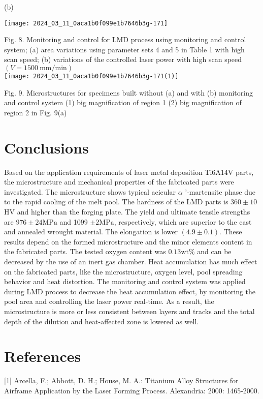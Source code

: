 \documentclass[10pt]{article}
\begin{document}
(b)

\begin{center}
\texttt{[image: 2024\_03\_11\_0aca1b0f099e1b7646b3g-171]}
\end{center}

Fig. 8. Monitoring and control for LMD process using monitoring and control system; (a) area variations using parameter sets 4 and 5 in Table 1 with high scan speed; (b) variations of the controlled laser power with high scan speed $(V=1500 \mathrm{~mm} / \mathrm{min})$\\
\texttt{[image: 2024\_03\_11\_0aca1b0f099e1b7646b3g-171(1)]}

Fig. 9. Microstructures for specimens built without (a) and with (b) monitoring and control system (1) big magnification of region 1 (2) big magnification of region 2 in Fig. 9(a)

\section*{Conclusions}
Based on the application requirements of laser metal deposition Ti6A14V parts, the microstructure and mechanical properties of the fabricated parts were investigated. The microstructure shows typical acicular $\alpha$ '-martensite phase due to the rapid cooling of the melt pool. The hardness of the LMD parts is $360 \pm 10$ $\mathrm{HV}$ and higher than the forging plate. The yield and ultimate tensile strengths are $976 \pm 24 \mathrm{MPa}$ and 1099 $\pm 2 \mathrm{MPa}$, respectively, which are superior to the cast and annealed wrought material. The elongation is lower $(4.9 \pm 0.1)$. These results depend on the formed microstructure and the minor elements content in the fabricated parts. The tested oxygen content was $0.13 \mathrm{wt} \%$ and can be decreased by the use of an inert gas chamber. Heat accumulation has much effect on the fabricated parts, like the microstructure, oxygen level, pool spreading behavior and heat distortion. The monitoring and control system was applied during LMD process to decrease the heat accumulation effect, by monitoring the pool area and controlling the laser power real-time. As a result, the microstructure is more or less consistent between layers and tracks and the total depth of the dilution and heat-affected zone is lowered as well.

\section*{References}
[1] Arcella, F.; Abbott, D. H.; House, M. A.: Titanium Alloy Structures for Airframe Application by the Laser Forming Process. Alexandria: 2000: 1465-2000.
\end{document}
